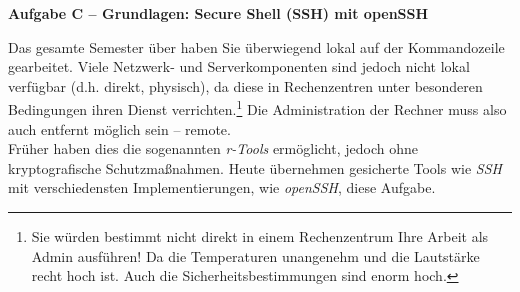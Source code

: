 \documentclass[paper=a4,fontsize=11pt]{scrartcl}%
\numberwithin{equation}{section}
\begin{document}
\begin{center}\Large{\textbf{Aufgabe C -- Grundlagen: Secure Shell (SSH) mit openSSH}}\end{center}\vskip0.25in
Das gesamte Semester über haben Sie überwiegend lokal auf der Kommandozeile gearbeitet. Viele Netzwerk- und Serverkomponenten sind jedoch nicht lokal verfügbar (d.h. direkt, physisch), da diese in Rechenzentren unter besonderen Bedingungen ihren Dienst verrichten.\footnote{Sie würden bestimmt nicht direkt in einem Rechenzentrum Ihre Arbeit als Admin ausführen! Da die Temperaturen unangenehm und die Lautstärke recht hoch ist. Auch die Sicherheitsbestimmungen sind enorm hoch.} Die Administration der Rechner muss also auch entfernt möglich sein -- remote.\\
Früher haben dies die sogenannten \emph{r-Tools} ermöglicht, jedoch ohne kryptografische Schutzmaßnahmen. Heute übernehmen gesicherte Tools wie \emph{SSH} mit verschiedensten Implementierungen, wie \emph{openSSH}, diese Aufgabe.
\end{document}

